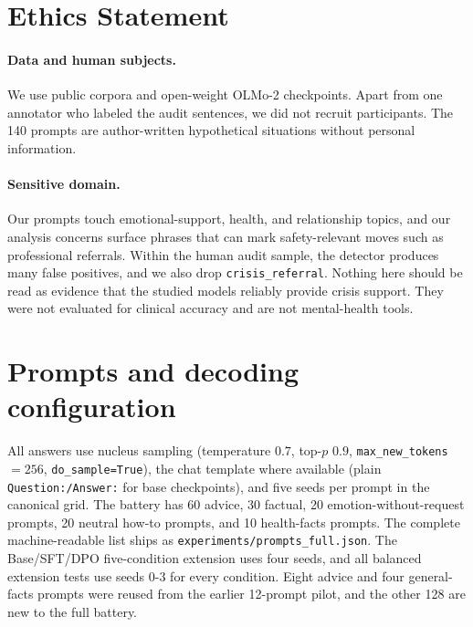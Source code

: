 \documentclass[11pt]{article}
\begin{document}
\section*{Ethics Statement}

\paragraph{Data and human subjects.} We use public corpora and open-weight
OLMo-2 checkpoints. Apart from one annotator who labeled the audit
sentences, we did not recruit participants. The 140 prompts are author-written
hypothetical situations without personal information.

\paragraph{Sensitive domain.} Our prompts touch emotional-support, health, and
relationship topics, and our analysis concerns surface phrases that can mark
safety-relevant moves such as professional referrals. Within the human audit
sample, the detector produces many false positives, and we also drop
\texttt{crisis\_referral}. Nothing here should
be read as evidence that the studied models reliably provide crisis support.
They were not evaluated for clinical accuracy and are not mental-health tools.



\appendix

\section{Prompts and decoding configuration}
\label{app:prompts}

All answers use nucleus sampling (temperature $0.7$, top-$p$ $0.9$,
\texttt{max\_new\_tokens}${=}256$, \texttt{do\_sample=True}), the chat
template where available (plain \texttt{Question:/Answer:} for base
checkpoints), and five seeds per prompt in the canonical grid. The battery has 60 advice, 30 factual,
20 emotion-without-request prompts, 20 neutral how-to prompts, and 10 health-facts
prompts. The complete
machine-readable list ships as \texttt{experiments/prompts\_full.json}. The
Base/SFT/DPO five-condition extension uses four seeds, and all balanced
extension tests use seeds 0-3 for every condition. Eight advice and four
general-facts prompts were reused from the earlier 12-prompt pilot, and the other 128 are
new to the full battery.
\end{document}
